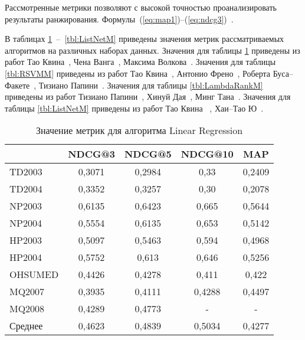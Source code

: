 Рассмотренные метрики позволяют с высокой точностью проанализировать результаты ранжирования. Формулы~(\ref{eq:map1})--(\ref{eq:ndcg3})~\cite{metrics}.

В таблицах \ref{tbl:LRM}~--~\ref{tbl:ListNetM} приведены значения метрик рассматриваемых алгоритмов на различных наборах данных.  Значения для таблицы \ref{tbl:LRM} приведены из работ Тао Квина~\cite{LETOR3}, Чена Ванга~\cite{LRM2}, Максима Волкова~\cite{LRM3}. Значения для таблицы \ref{tbl:RSVMM} приведены из работ Тао Квина~\cite{LETOR3}, Антонио Френо~\cite{AOL}, Роберта Буса--Факете~\cite{RSVMM1}, Тизиано Папини~\cite{RSVMM2}. Значения для таблицы \ref{tbl:LambdaRankM} приведены из работ Тизиано Папини~\cite{RSVMM2}, Хинуй Дая~\cite{LDRM1}, Минг Тана~\cite{LDRM2}. Значения для таблицы \ref{tbl:ListNetM} приведены из работ Тао Квина ~\cite{LETOR3}, Хаи--Тао Ю~\cite{LNM1}.

\begin{table}[!ht]
	\begin{center}
		\begin{threeparttable}
			\captionsetup{justification=raggedright,singlelinecheck=off}
			\caption{Значение метрик для алгоритма Linear Regression}
			\label{tbl:LRM}
			\begin{tabular}{|l|c|c|c|c|}
				\hline
				\makecell[c]{Датасет}& NDCG@3 & NDCG@5 & NDCG@10 & MAP \\\hline
				TD2003&	0,3071&	0,2984&	0,33&	0,2409\\\hline
				TD2004&	0,3352&	0,3257&	0,30&	0,2078\\\hline
				NP2003&	0,6135&	0,6423&	0,665&	0,5644\\\hline
				NP2004&	0,5554&	0,6135&	0,653&	0,5142\\\hline
				HP2003&	0,5097&	0,5463&	0,594&	0,4968\\\hline
				HP2004&	0,5752&	0,613&	0,646&	0,5256\\\hline
				OHSUMED&	0,4426&	0,4278&	0,411&	0,422\\\hline
				MQ2007&	0,3935&	0,4111&	0,4288&	0,4497\\\hline
				MQ2008&	0,4289&	0,4773&	-&	-\\\hline
				Среднее& 0,4623&	0,4839&	0,5034&	0,4277\\\hline
			\end{tabular}
		\end{threeparttable}
	\end{center}
\end{table}

